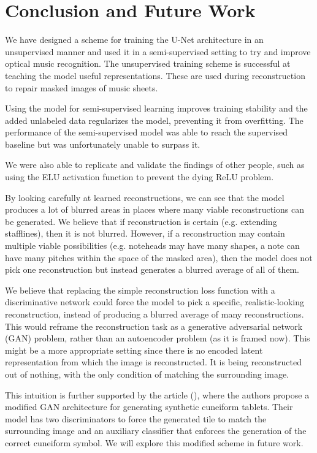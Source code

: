 \chapter{Conclusion and Future Work}
\label{chap:ConclusionAndFutureWork}

We have designed a scheme for training the U-Net architecture in an unsupervised manner and used it in a semi-supervised setting to try and improve optical music recognition. The unsupervised training scheme is successful at teaching the model useful representations. These are used during reconstruction to repair masked images of music sheets.

Using the model for semi-supervised learning improves training stability and the added unlabeled data regularizes the model, preventing it from overfitting. The performance of the semi-supervised model was able to reach the supervised baseline but was unfortunately unable to surpass it.

We were also able to replicate and validate the findings of other people, such as using the ELU activation function to prevent the dying ReLU problem.

By looking carefully at learned reconstructions, we can see that the model produces a lot of blurred areas in places where many viable reconstructions can be generated. We believe that if reconstruction is certain (e.g. extending stafflines), then it is not blurred. However, if a reconstruction may contain multiple viable possibilities (e.g. noteheads may have many shapes, a note can have many pitches within the space of the masked area), then the model does not pick one reconstruction but instead generates a blurred average of all of them.

We believe that replacing the simple reconstruction loss function with a discriminative network could force the model to pick a specific, realistic-looking reconstruction, instead of producing a blurred average of many reconstructions. This would reframe the reconstruction task as a generative adversarial network (GAN) problem, rather than an autoencoder problem (as it is framed now). This might be a more appropriate setting since there is no encoded latent representation from which the image is reconstructed. It is being reconstructed out of nothing, with the only condition of matching the surrounding image.

This intuition is further supported by the article (\cite{Cuneiforms}), where the authors propose a modified GAN architecture for generating synthetic cuneiform tablets. Their model has two discriminators to force the generated tile to match the surrounding image and an auxiliary classifier that enforces the generation of the correct cuneiform symbol. We will explore this modified scheme in future work.


